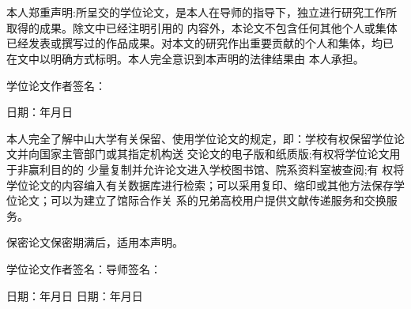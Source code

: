 \chapter*{}
\fontsize{15}{20}\selectfont
	本人郑重声明:所呈交的学位论文，是本人在导师的指导下，独立进行研究工作所取得的成果。除文中已经注明引用的 内容外，本论文不包含任何其他个人或集体已经发表或撰写过的作品成果。对本文的研究作出重要贡献的个人和集体，均已 在文中以明确方式标明。本人完全意识到本声明的法律结果由 本人承担。

	
学位论文作者签名：

日期：\quad \quad 年\quad \quad 月\quad \quad 日

\vspace{2\baselineskip}
本人完全了解中山大学有关保留、使用学位论文的规定，即：学校有权保留学位论文并向国家主管部门或其指定机构送 交论文的电子版和纸质版;有权将学位论文用于非赢利目的的 少量复制并允许论文进入学校图书馆、院系资料室被查阅;有 权将学位论文的内容编入有关数据库进行检索；可以采用复印、缩印或其他方法保存学位论文；可以为建立了馆际合作关 系的兄弟高校用户提供文献传递服务和交换服务。

保密论文保密期满后，适用本声明。

学位论文作者签名：\qquad  \qquad \qquad \quad 导师签名：

日期：\quad \quad 年\quad \quad 月\quad \quad 日 \qquad \qquad 日期：\quad \quad 年\quad \quad 月\quad \quad 日

\endinput
